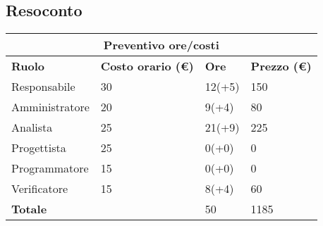 \documentclass[12pt]{article}
\begin{document}
\subsection{Resoconto}
\begin{center}
    \begin{tabularx}{\textwidth}{|X|X|X|X|}
        \hline
        \multicolumn{4}{|c|}{\textbf{Preventivo ore/costi}}\\
        \hline
        \hline
        \textbf{Ruolo} & \textbf{Costo orario (\euro)} & \textbf{Ore} & \textbf{Prezzo (\euro)}\\
        \hline
        Responsabile    & 30 & 12(+5)  & 150\\
        \hline
        Amministratore  & 20 & 9(+4)  & 80\\
        \hline
        Analista        & 25 & 21(+9)  & 225\\
        \hline
        Progettista     & 25 & 0(+0)  & 0\\
        \hline
        Programmatore   & 15 & 0(+0)  & 0\\
        \hline
        Verificatore    & 15 & 8(+4)  & 60\\
        \hline
        \hline
        \textbf{Totale} &    & 50 &  1185 \\
        \hline
    \end{tabularx}\\[8pt]
    \mbox{}\\
\end{center}
\end{document}

